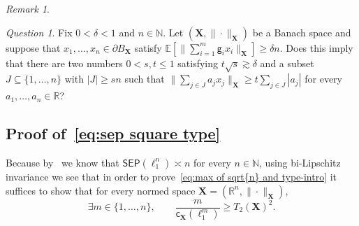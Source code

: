 \documentclass[11pt,reqno]{amsart}
\renewcommand{\le}{\leqslant}
\renewcommand{\ge}{\geqslant}
\renewcommand{\d}{\delta}
\newcommand{\cc}{\mathsf{c}}
\newcommand{\n}{\{1,\ldots,n\}}
\newcommand{\X}{\mathbf X}
\newcommand{\R}{\mathbb R}
\theoremstyle{remark}
\newtheorem{remark}[theorem]{Remark}
\newtheorem{question}[theorem]{Question}
\renewcommand{\subset}{\subseteq}
\newcommand{\E}{\mathbb{ E}}
\newcommand{\N}{\mathbb N}
\renewcommand{\1}{\mathbf 1}
\newcommand{\sep}{\mathsf{SEP}}
\newcommand{\g}{\mathsf{g}}
\begin{document}
\begin{remark}
\begin{question}\label{eq:sharp 2 parameter elton} Fix $0<\d<1$ and $n\in \N$. Let $(\X,\|\cdot\|_\X)$ be a Banach space and suppose that $x_1,\ldots,x_n\in \partial B_\X$ satisfy $
\E[\|\sum_{i=1}^m \g_i x_i\|_{\X}]\ge \d n$.
Does this imply that there are two numbers $0<s,t\le 1$ satisfying $t\sqrt{s}\gtrsim \d$ and a subset $J\subset \n$ with $|J|\ge sn$ such that $\|\sum_{j\in J} a_j x_j\|_\X\ge t\sum_{j\in J} |a_j|$ for every $a_1,\ldots,a_n\in \R$?
\end{question}
\end{remark}


\subsection{Proof of~\eqref{eq:sep square type}}\label{sec:consequences of distance} Because by~\cite{CCGGP98} we know that $\sep(\ell_1^n)\asymp n$ for every $n\in \N$, using bi-Lipschitz invariance we see that in order to prove~\eqref{eq:max of sqrt{n} and type-intro} it suffices to show that for every normed space $\X=(\R^n,\|\cdot\|_\X)$,
\begin{equation}\label{eq:m over dist}
\exists m\in \n,\qquad \frac{m}{\cc_\X(\ell_1^m)}\ge T_2(\X)^2.
\end{equation}
\end{document}
